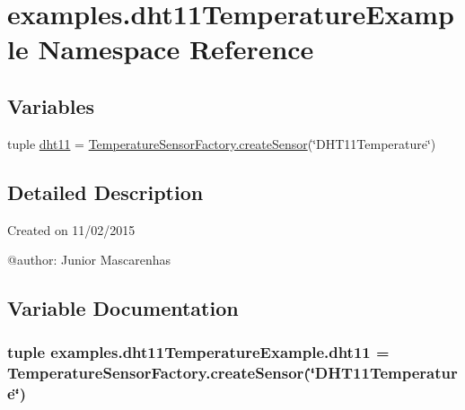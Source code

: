 \hypertarget{namespaceexamples_1_1dht11TemperatureExample}{}\section{examples.\+dht11\+Temperature\+Example Namespace Reference}
\label{namespaceexamples_1_1dht11TemperatureExample}
\subsection*{Variables}
\begin{DoxyCompactItemize}
\item 
tuple \hyperlink{namespaceexamples_1_1dht11TemperatureExample_acae944ec2fea4b2036291646fb56e0b7}{dht11} = \hyperlink{classconcretefactory_1_1temperatureSensorFactory_1_1TemperatureSensorFactory_a10da40452b9fced7f217c6716e8d5ecc}{Temperature\+Sensor\+Factory.\+create\+Sensor}(\char`\"{}D\+H\+T11\+Temperature\char`\"{})
\end{DoxyCompactItemize}


\subsection{Detailed Description}
\begin{DoxyVerb}Created on 11/02/2015

@author: Junior Mascarenhas
\end{DoxyVerb}
 

\subsection{Variable Documentation}
\hypertarget{namespaceexamples_1_1dht11TemperatureExample_acae944ec2fea4b2036291646fb56e0b7}{}
\subsubsection[{dht11}]{\setlength{\rightskip}{0pt plus 5cm}tuple examples.\+dht11\+Temperature\+Example.\+dht11 = {\bf Temperature\+Sensor\+Factory.\+create\+Sensor}(\char`\"{}D\+H\+T11\+Temperature\char`\"{})}\label{namespaceexamples_1_1dht11TemperatureExample_acae944ec2fea4b2036291646fb56e0b7}
